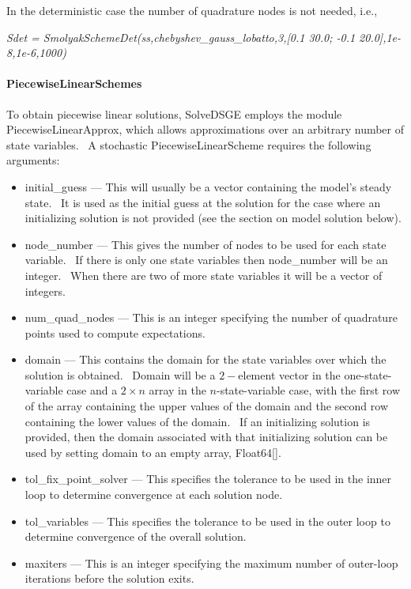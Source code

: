 \documentclass[notitlepage,11pt]{article}
\begin{document}
\bigskip

In the deterministic case the number of quadrature nodes is not needed, i.e.,

\bigskip

\textit{Sdet = SmolyakSchemeDet(ss,chebyshev\_gauss\_lobatto,3,[0.1 30.0;
-0.1 20.0],1e-8,1e-6,1000)}

\paragraph{PiecewiseLinearSchemes}

To obtain piecewise linear solutions, SolveDSGE employs the module
PiecewiseLinearApprox, which allows approximations over an arbitrary number
of state variables. \ A stochastic PiecewiseLinearScheme requires the
following arguments:

\begin{itemize}
\item initial\_guess --- This will usually be a vector containing the
model's steady state. \ It is used as the initial guess at the solution for
the case where an initializing solution is not provided (see the section on
model solution below).

\item node\_number --- This gives the number of nodes to be used for each
state variable. \ If there is only one state variables then node\_number
will be an integer. \ When there are two of more state variables it will be
a vector of integers.

\item num\_quad\_nodes --- This is an integer specifying the number of
quadrature points used to compute expectations.

\item domain --- This contains the domain for the state variables over which
the solution is obtained. \ Domain will be a $2-$element vector in the
one-state-variable case and a $2\times n$ array in the $n$-state-variable
case, with the first row of the array containing the upper values of the
domain and the second row containing the lower values of the domain. \ If an
initializing solution is provided, then the domain associated with that
initializing solution can be used by setting domain to an empty array,
Float64[].

\item tol\_fix\_point\_solver --- This specifies the tolerance to be used in
the inner loop to determine convergence at each solution node.

\item tol\_variables --- This specifies the tolerance to be used in the
outer loop to determine convergence of the overall solution.

\item maxiters --- This is an integer specifying the maximum number of
outer-loop iterations before the solution exits.
\end{itemize}
\end{document}
